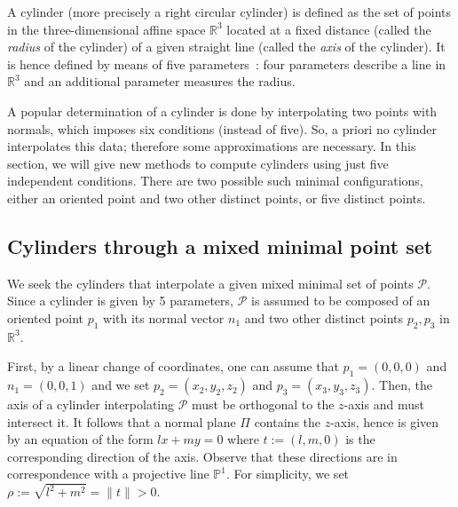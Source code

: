 \documentclass[5p]{elsarticle}
\newcommand\RR{\mathbb R}
\newcommand\PP{\mathbb P}
\newcommand\Pc{\mathcal P}
\newcommand{\com}[1]{{\color{black} #1}}
\begin{document}
A cylinder (more precisely a right circular cylinder) is defined as the set of points in the three-dimensional affine space $\RR^3$ located at a fixed distance (called the \emph{radius} of the cylinder) of a given straight line (called the \emph{axis} of the cylinder). It is hence defined by means of five parameters~: four parameters describe a line in $\RR^3$ and an additional parameter measures the radius. 


\medskip

A popular determination of a cylinder is done \com{by interpolating} two points with normals, which imposes six conditions (instead of five). So, a priori no cylinder interpolates \com{this data}; therefore some approximations are necessary.  In this section, we will give new methods to compute  \com{cylinders} using just five independent conditions. There are two possible such minimal configurations, either an oriented point and two other distinct points, or five distinct points.  


\subsection{Cylinders through a mixed minimal point set}

\com{We seek} the cylinders that interpolate a given mixed minimal set of points $\Pc$. Since a cylinder is given by 5 parameters, $\Pc$ is assumed to be composed of an oriented point $p_1$ with its normal vector $n_1$ and two other distinct points $p_2, p_3$ in $\RR^3$. 

\medskip

First, by a linear change of coordinates, one can assume that $p_1=(0,0,0)$ and  $n_1=(0,0,1)$ and we set $p_2=(x_2,y_2,z_2)$ and $p_3=(x_3,y_3,z_3)$. Then, the axis of a cylinder interpolating $\Pc$ must be orthogonal to the $z$-axis and must intersect it. It follows that a normal plane $\Pi$ contains the $z$-axis, hence is given by an equation of the form $lx+my=0$ where $t:=(l,m,0)$ is the corresponding direction of the axis. Observe that these directions are in correspondence with a projective line $\PP^1$. For simplicity, we set $\rho:=\sqrt{l^2+m^2}=\|t\|>0$.
\end{document}
